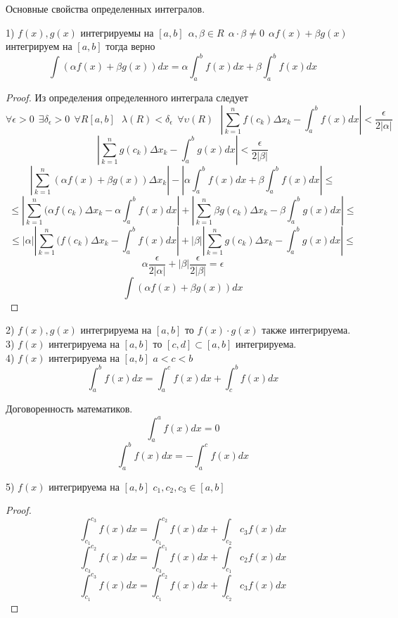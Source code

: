\begin{title}[\Large]
    Основные свойства определенных интегралов.
\end{title}

1) $f(x), g(x)$ интегрируемы на $[a, b] ~~ \alpha , \beta \in R ~~ \alpha \cdot
\beta \not= 0 ~~ \alpha f(x) + \beta g(x)$ интегрируем на $[a, b]$ тогда верно
\[
    \int (\alpha f(x) + \beta g(x))dx = \alpha \int_a^b f(x)dx
    + \beta \int_a^b f(x)dx
\]

\begin{proof}
    Из определения определенного интеграла следует
    \[
        \forall\epsilon>0 ~~ \exists\delta_{\epsilon}>0 ~~ \forall R[a,b] ~~~
        \lambda(R) < \delta_{\epsilon} ~~ \forall\upsilon(R) ~~~
        \left| \sum_{k=1}^{n} f(c_k)\Delta x_k -
        \int_a^b f(x)dx \right| < \frac{\epsilon}{2|\alpha|}
    \]
    \[
        \left| \sum_{k=1}^{n} g(c_k)\Delta x_k -
        \int_a^b g(x)dx \right| < \frac{\epsilon}{2|\beta|}
    \]
    \[
        \left| \sum_{k=1}^{n} (\alpha f(x) + \beta g(x))\Delta x_k \right| -
        \left| \alpha \int_a^b f(x)dx + \beta \int_a^b f(x)dx \right| \le
    \]
    \[
      \le \left| \sum_{k=1}^{n} (\alpha f(c_k) \Delta x_k -
      \alpha \int_a^b f(x)dx \right| + \left| \sum_{k=1}^{n} \beta g(c_k)
      \Delta x_k - \beta \int_a^b g(x)dx \right| \le
    \]
    \[
      \le |\alpha| \left| \sum_{k=1}^{n} (f(c_k) \Delta x_k -
      \int_a^b f(x)dx \right| + |\beta| \left| \sum_{k=1}^{n} g(c_k)
      \Delta x_k - \int_a^b g(x)dx \right| \le
    \]
    \[
        \alpha \frac{\epsilon}{2|\alpha|} + |\beta| \frac{\epsilon}{2|\beta|}
        = \epsilon
    \]
    \[
        \int (\alpha f(x) + \beta g(x))dx
    \]
\end{proof}

2) $f(x), g(x)$ интегрируема на $[a, b]$ то $f(x) \cdot g(x)$ также
интегрируема.\\
3) $f(x)$ интегрируема на $[a, b]$ то $[c, d] \subset [a, b]$ интегрируема.\\
4) $f(x)$ интегрируема на $[a, b]$ $a < c < b$
    \[
        \int_a^b f(x)dx = \int_a^c f(x)dx + \int_c^b f(x)dx
    \]

Договоренность математиков.
\[
    \int_a^a f(x)dx = 0
\]
\[
    \int_a^b f(x)dx = - \int_a^c f(x)dx
\]

5) $f(x)$ интегрируема на $[a, b]$ $c_1, c_2, c_3 \in [a, b]$
\begin{proof}
    \[
    \int_{c_1}^{c_3} f(x)dx = \int_{c_1}^{c_2} f(x)dx + \int_{c_2}{c_3} f(x)dx
    \]
    \[
        \int_{c_3}^{c_2} f(x)dx = \int_{c_3}^{c_1}f(x)dx + \int_{c_1}{c_2}f(x)dx
    \]
    \[
        \int_{c_1}^{c_3} f(x)dx = \int_{c_1}^{c_2}f(x)dx + \int_{c_2}{c_3}f(x)dx
    \]
\end{proof}


